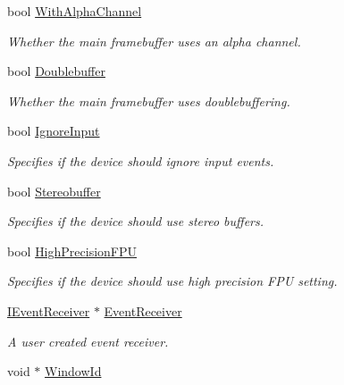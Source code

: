 \begin{DoxyCompactItemize}
bool \hyperlink{structirr_1_1SIrrlichtCreationParameters_acae5b5e41cec776aa4d05a03f16c57f2}{With\+Alpha\+Channel}
\begin{DoxyCompactList}\small\item\em Whether the main framebuffer uses an alpha channel. \end{DoxyCompactList}\item 
bool \hyperlink{structirr_1_1SIrrlichtCreationParameters_a49f2c3ed6cc7a28f2fde6683ac0b3267}{Doublebuffer}
\begin{DoxyCompactList}\small\item\em Whether the main framebuffer uses doublebuffering. \end{DoxyCompactList}\item 
bool \hyperlink{structirr_1_1SIrrlichtCreationParameters_acf9aee48aa9193f025f5f855d5a147cb}{Ignore\+Input}
\begin{DoxyCompactList}\small\item\em Specifies if the device should ignore input events. \end{DoxyCompactList}\item 
bool \hyperlink{structirr_1_1SIrrlichtCreationParameters_ae5dd722bd6c5a7001b73ef92264220a5}{Stereobuffer}
\begin{DoxyCompactList}\small\item\em Specifies if the device should use stereo buffers. \end{DoxyCompactList}\item 
bool \hyperlink{structirr_1_1SIrrlichtCreationParameters_ac790f1359a357f705bc2a5b24a6cc55d}{High\+Precision\+F\+PU}
\begin{DoxyCompactList}\small\item\em Specifies if the device should use high precision F\+PU setting. \end{DoxyCompactList}\item 
\mbox{\label{structirr_1_1SIrrlichtCreationParameters_a600183dad7a2f6836e585d7a0d4e3e89}} 
\hyperlink{classirr_1_1IEventReceiver}{I\+Event\+Receiver} $\ast$ \hyperlink{structirr_1_1SIrrlichtCreationParameters_a600183dad7a2f6836e585d7a0d4e3e89}{Event\+Receiver}
\begin{DoxyCompactList}\small\item\em A user created event receiver. \end{DoxyCompactList}\item 
void $\ast$ \hyperlink{structirr_1_1SIrrlichtCreationParameters_af287810d910a23f8f7db98cef87b6eae}{Window\+Id}

\end{DoxyCompactItemize}
